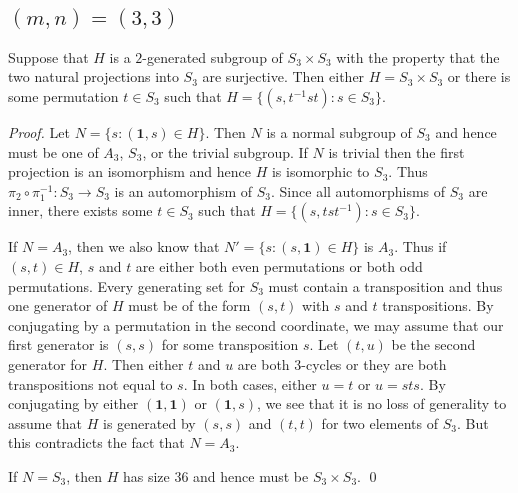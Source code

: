 \documentclass{llncs}
\newcommand{\one}{{\mathbf 1}}
\begin{document}
\subsection{$(m,n)=(3,3)$}
\begin{lemma}   
Suppose that $H$ is a $2$-generated subgroup of $S_3\times S_3$ with the property that the two natural projections into $S_3$ are surjective.  Then either $H=S_3\times S_3$ or there is some permutation $t\in S_3$ such that $H=\{(s,t^{-1}st)\colon s\in S_3\}$.  
\label{lem:s3}
\end{lemma}
\begin{proof}
Let $N=\{s\colon (\one,s)\in H\}$.  Then $N$ is a normal subgroup of $S_3$ and hence must be one of $A_3$, $S_3$, or the trivial subgroup.  If $N$ is trivial then the first projection is an isomorphism and hence $H$ is isomorphic to $S_3$.  Thus $\pi_2\circ \pi_1^{-1}:S_3\to S_3$ is an automorphism of $S_3$.  Since all automorphisms of $S_3$ are inner, there exists some $t\in S_3$ such that $H=\{(s,tst^{-1})\colon s\in S_3\}$.  

If $N=A_3$, then we also know that $N'=\{s\colon (s,\one)\in H\}$ is $A_3$.  Thus if $(s,t)\in H$, $s$ and $t$ are either both even permutations or both odd permutations.  Every generating set for $S_3$ must contain a transposition and thus one generator of $H$ must be of the form $(s,t)$ with $s$ and $t$ transpositions.  By conjugating by a permutation in the second coordinate, we may assume that our first generator is $(s,s)$ for some transposition $s$.  Let $(t,u)$ be the second generator for $H$.  Then either $t$ and $u$ are both 3-cycles or they are both transpositions not equal to $s$.  In both cases, either $u=t$ or $u=sts$. By conjugating by either $(\one,\one)$ or  $(\one,s)$, we see that it is no loss of generality to assume that $H$ is generated by $(s,s)$ and $(t,t)$ for two elements of $S_3$.  But this contradicts the fact that $N=A_3$.

If $N=S_3$, then $H$ has size $36$ and hence must be $S_3\times S_3$. 
\qed
\end{proof}
\end{document}
